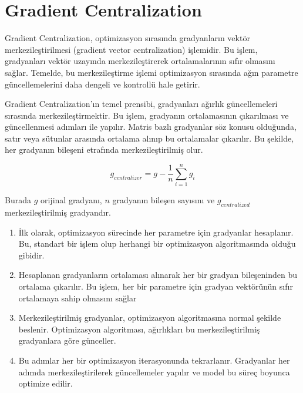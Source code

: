 \section{Gradient Centralization}

Gradient Centralization, optimizasyon sırasında gradyanların vektör merkezileştirilmesi (gradient vector centralization) işlemidir. Bu işlem, gradyanları vektör uzayında merkezileştirerek ortalamalarının sıfır olmasını sağlar. Temelde, bu merkezileştirme işlemi optimizasyon sırasında ağın parametre güncellemelerini daha dengeli ve kontrollü hale getirir.

Gradient Centralization'ın temel prensibi, gradyanları ağırlık güncellemeleri sırasında merkezileştirmektir. Bu işlem, gradyanın ortalamasının çıkarılması ve güncellenmesi adımları ile yapılır. Matris bazlı gradyanlar söz konusu olduğunda, satır veya sütunlar arasında ortalama alınıp bu ortalamalar çıkarılır. Bu şekilde, her gradyanın bileşeni etrafında merkezileştirilmiş olur.

\[ g_{centralizer} = g - \frac{1}{n} \sum_{i=1}^n g_i \]

Burada $g$ orijinal gradyanı, $n$ gradyanın bileşen sayısını ve $g_{centralized}$ merkezileştirilmiş gradyandır.

\begin{enumerate}
    \item İlk olarak, optimizasyon sürecinde her parametre için gradyanlar hesaplanır. Bu, standart bir işlem olup herhangi bir optimizasyon algoritmasında olduğu gibidir.
    \item Hesaplanan gradyanların ortalaması alınarak her bir gradyan bileşeninden bu ortalama çıkarılır. Bu işlem, her bir parametre için gradyan vektörünün sıfır ortalamaya sahip olmasını sağlar
    \item Merkezileştirilmiş gradyanlar, optimizasyon algoritmasına normal şekilde beslenir. Optimizasyon algoritması, ağırlıkları bu merkezileştirilmiş gradyanlara göre günceller.
    \item Bu adımlar her bir optimizasyon iterasyonunda tekrarlanır. Gradyanlar her adımda merkezileştirilerek güncellemeler yapılır ve model bu süreç boyunca optimize edilir.
\end{enumerate}

\newpage